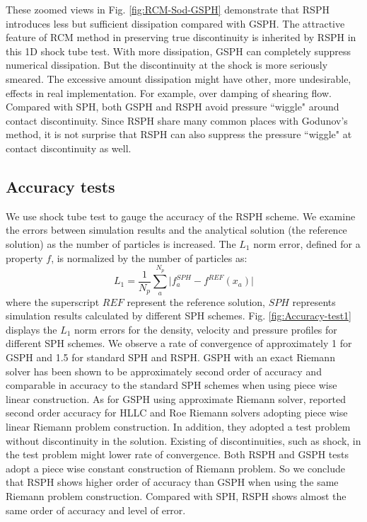 These zoomed views in Fig. \ref{fig:RCM-Sod-GSPH} demonstrate that RSPH introduces less but sufficient dissipation compared with GSPH. The attractive feature of RCM method in preserving true discontinuity is inherited by RSPH in this 1D shock tube test. With more dissipation, GSPH can completely suppress numerical dissipation. But the discontinuity at the shock is more seriously smeared. The excessive amount dissipation might have other, more undesirable, effects in real implementation. For example, over damping of shearing flow. Compared with SPH, both GSPH and RSPH avoid pressure ``wiggle" around contact discontinuity. Since RSPH share many common places with Godunov's method, it is not surprise that RSPH can also suppress the pressure ``wiggle" at contact discontinuity as well.

\subsection{Accuracy tests}
We use shock tube test to gauge the accuracy of the RSPH scheme.
We examine the errors between simulation results and the analytical solution (the reference solution) as the number of particles is increased. The $L_1$ norm error, defined for a property $f$, is normalized by the number of particles as:
\begin{equation}
L_1= \frac{1}{N_p} \sum_a^{N_p} \vert f_a^{SPH} - f^{REF} (x_a) \vert 
\end{equation}
where the superscript $REF$ represent the reference solution, $SPH$ represents simulation results calculated by different SPH schemes. Fig. \ref{fig:Accuracy-test1} displays the $L_1$ norm errors for the density, velocity and pressure profiles for different SPH schemes.
We observe a rate of convergence of approximately 1 for GSPH and 1.5 for standard SPH and RSPH.
GSPH with an exact Riemann solver has been shown to be approximately second order of accuracy \citep{puri2014comparison} and comparable in accuracy to the standard SPH schemes when using piece wise linear construction. As for GSPH using approximate Riemann solver, \citet{puri2014approximate} reported second order accuracy for HLLC and Roe Riemann solvers adopting piece wise linear Riemann problem construction. In addition, they adopted a test problem without discontinuity in the solution. Existing of discontinuities, such as shock, in the test problem might lower rate of convergence. Both RSPH and GSPH tests adopt a piece wise constant construction of Riemann problem. So we conclude that RSPH shows higher order of accuracy than GSPH when using the same Riemann problem construction. Compared with SPH, RSPH shows almost the same order of accuracy and level of error.
